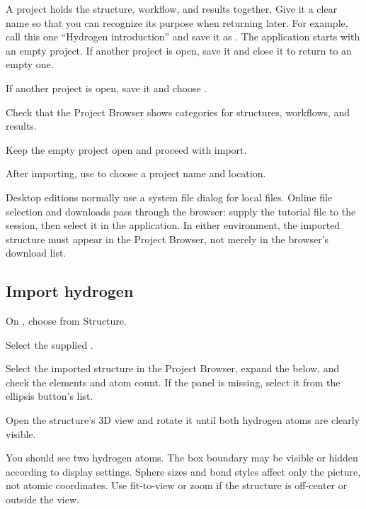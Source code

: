 A project holds the structure, workflow, and results together. Give it a clear name so that you can recognize its purpose when returning later. For example, call this one ``Hydrogen introduction'' and save it as . The application starts with an empty project. If another project is open, save it and close it to return to an empty one.

\begin{steps}
\item If another project is open, save it and choose .
\item Check that the Project Browser shows categories for structures, workflows, and results.
\item Keep the empty project open and proceed with import.
\item After importing, use  to choose a project name and location.
\end{steps}

Desktop editions normally use a system file dialog for local files. Online file selection and downloads pass through the browser: supply the tutorial file to the session, then select it in the application. In either environment, the imported structure must appear in the Project Browser, not merely in the browser's download list.

\subsection{Import hydrogen}

\begin{steps}
\item On , choose  from Structure.
\item Select the supplied .
\item Select the imported structure in the Project Browser, expand the  below, and check the elements and atom count. If the panel is missing, select it from the ellipsis button's  list.
\item Open the structure's 3D view and rotate it until both hydrogen atoms are clearly visible.
\end{steps}

You should see two hydrogen atoms. The box boundary may be visible or hidden according to display settings. Sphere sizes and bond styles affect only the picture, not atomic coordinates. Use fit-to-view or zoom if the structure is off-center or outside the view.

